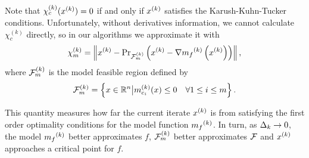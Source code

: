 Note that $\chi_c^{(k)}(x^{(k)}) = 0$ if and only if $x^{(k)}$ satisfies the Karush-Kuhn-Tucker conditions.
Unfortunately,  without derivatives information, we cannot calculate $\chi_c^{(k)}$ directly, so in our algorithms we approximate it with
\begin{align}
\label{define_criticality_measure}
{\chi_m^{(k)}} = \left\|x^{(k)} - {\textrm{Pr}}_{{\mathcal F_m^{(k)}}}\left(x^{(k)}- \nabla {{m}_f}^{(k)}\left(x^{(k)}\right)\right)\right\|,
\end{align}
where ${\mathcal F_m^{(k)}}$ is the model feasible region defined by
\begin{align}
{\mathcal F_m^{(k)}} = \left\{x \in \mathbb R^n \big| {{m}^{(k)}_{c_i}}(x) \le 0 \quad \forall 1 \le i \le m \right\}.  \label{define_feasiblek}
\end{align} 

This quantity measures how far the current iterate $x^{(k)}$ is from satisfying the first order optimality conditions for the model function ${{m}_f}^{(k)}$.
In turn, as $\Delta_k \to 0$, the model ${{m}_f}^{(k)}$ better approximates $f$, ${\mathcal F_m^{(k)}}$ better approximates ${\mathcal F}$ and $x^{(k)}$ approaches a critical point for $f$.





% 
% 
% 





